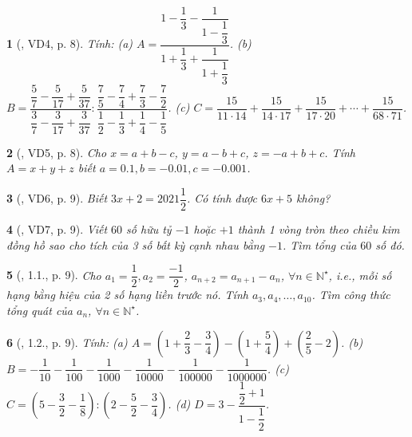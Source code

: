 \documentclass{article}
\newtheorem{baitoan}{}
\begin{document}
\begin{baitoan}[\cite{Binh_boi_duong_Toan_7_tap_1}, VD4, p. 8]
	Tính: (a) $A = \dfrac{1 - \dfrac{1}{3} - \dfrac{1}{1 - \dfrac{1}{3}}}{1 + \dfrac{1}{3} + \dfrac{1}{1 + \dfrac{1}{3}}}$. (b) $B = \dfrac{\dfrac{5}{7} - \dfrac{5}{17} + \dfrac{5}{37}}{\dfrac{3}{7} - \dfrac{3}{17} + \dfrac{3}{37}}:\dfrac{\dfrac{7}{5} - \dfrac{7}{4} + \dfrac{7}{3} - \dfrac{7}{2}}{\dfrac{1}{2} - \dfrac{1}{3} + \dfrac{1}{4} - \dfrac{1}{5}}$. (c) $C = \dfrac{15}{11\cdot14} + \dfrac{15}{14\cdot17} + \dfrac{15}{17\cdot20} + \cdots + \dfrac{15}{68\cdot71}$.
\end{baitoan}

\begin{baitoan}[\cite{Binh_boi_duong_Toan_7_tap_1}, VD5, p. 8]
	Cho $x = a + b - c$, $y = a - b + c$, $z = -a + b + c$. Tính $A = x + y + z$ biết $a = 0.1,b = -0.01,c = -0.001$.
\end{baitoan}

\begin{baitoan}[\cite{Binh_boi_duong_Toan_7_tap_1}, VD6, p. 9]
	Biết $3x + 2 = 2021\dfrac{1}{2}$. Có tính được $6x + 5$ không?
\end{baitoan}

\begin{baitoan}[\cite{Binh_boi_duong_Toan_7_tap_1}, VD7, p. 9]
	Viết $60$ số hữu tỷ $-1$ hoặc $+1$ thành 1 vòng tròn theo chiều kim đồng hồ sao cho tích của 3 số bất kỳ cạnh nhau bằng $-1$. Tìm tổng của $60$ số đó.
\end{baitoan}

\begin{baitoan}[\cite{Binh_boi_duong_Toan_7_tap_1}, 1.1., p. 9]
	Cho $a_1 = \dfrac{1}{2},a_2 = \dfrac{-1}{2}$, $a_{n+2} = a_{n+1} - a_n$, $\forall n\in\mathbb{N}^\star$, i.e., mỗi số hạng bằng hiệu của 2 số hạng liền trước nó. Tính $a_3,a_4,\ldots,a_{10}$. Tìm công thức tổng quát của $a_n$, $\forall n\in\mathbb{N}^\star$.
\end{baitoan}

\begin{baitoan}[\cite{Binh_boi_duong_Toan_7_tap_1}, 1.2., p. 9]
	Tính: (a) $A = \left(1 + \dfrac{2}{3} - \dfrac{3}{4}\right) - \left(1 + \dfrac{5}{4}\right) + \left(\dfrac{2}{5} - 2\right)$. (b) $B = -\dfrac{1}{10} - \dfrac{1}{100} - \dfrac{1}{1000} - \dfrac{1}{10000} - \dfrac{1}{100000} - \dfrac{1}{1000000}$. (c) $C = \left(5 - \dfrac{3}{2} - \dfrac{1}{8}\right):\left(2 - \dfrac{5}{2} - \dfrac{3}{4}\right)$. (d) $D = 3 - \dfrac{\dfrac{1}{2} + 1}{1 - \dfrac{1}{2}}$.
\end{baitoan}
\end{document}
